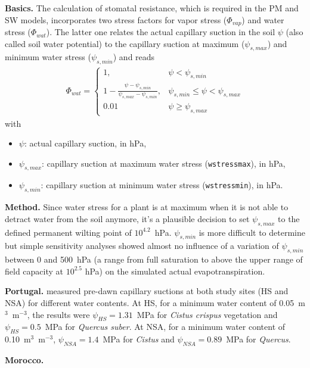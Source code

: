 \documentclass{scrreprt}
\newenvironment{denseitem}{
  \begin{itemize}
    \setlength{\itemsep}{0pt}
    \setlength{\parskip}{0pt}
    \setlength{\parsep}{0pt}
}{
  \end{itemize}
}
\begin{document}
\textbf{Basics.}
The calculation of stomatal resistance, which is required in the PM and SW models, incorporates two stress factors for vapor stress ($\Phi_{vap}$) and water stress ($\Phi_{wat}$).
The latter one relates the actual capillary suction in the soil $\psi$ (also called soil water potential) to the capillary suction at maximum ($\psi_{s,max}$) and minimum water stress ($\psi_{s,min}$) and reads
%
\begin{align*}
  \Phi_{wat} = \begin{cases}
                1, & \psi < \psi_{s,min} \\
                1 - \frac{\psi - \psi_{s,min}}{\psi_{s,max} - \psi_{s,min}}, & \psi_{s,min} \leq \psi < \psi_{s,max} \\
                0.01 & \psi \geq \psi_{s,max}
              \end{cases}
\end{align*}
%
with
\begin{denseitem}
  \item[] $\psi$: actual capillary suction, in hPa,
  \item[] $\psi_{s,max}$: capillary suction at maximum water stress (\verb!wstressmax!), in hPa,
  \item[] $\psi_{s,min}$: capillary suction at minimum water stress (\verb!wstressmin!), in hPa.
\end{denseitem}

\noindent
\textbf{Method.}
Since water stress for a plant is at maximum when it is not able to detract water from the soil anymore, it's a plausible decision to set $\psi_{s,max}$ to the defined \citep{scheffer10} permanent wilting point of $10^{4.2}$~hPa.
$\psi_{s,min}$ is more difficult to determine but simple sensitivity analyses showed almost no influence of a variation of $\psi_{s,min}$ between 0 and 500~hPa (a range from full saturation to above the upper range of field capacity at $10^{2.5}$ hPa) on the simulated actual evapotranspiration.

\noindent
\textbf{Portugal.}
\citet{gazdar16} measured pre-dawn capillary suctions at both study sites (HS and NSA) for different water contents.
At HS, for a minimum water content of 0.05~m$^3$~m$^{-3}$, the results were $\psi_{HS} = 1.31$~MPa for \emph{Cistus crispus} vegetation and $\psi_{HS} = 0.5$~MPa for \emph{Quercus suber}.
At NSA, for a minimum water content of 0.10~m$^3$~m$^{-3}$, $\psi_{NSA} = 1.4$~MPa for \emph{Cistus} and $\psi_{NSA} = 0.89$~MPa for \emph{Quercus}.

\noindent
\textbf{Morocco.}
\end{document}
